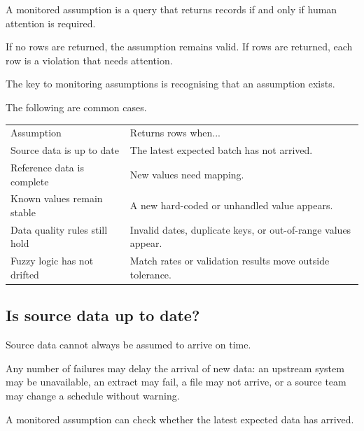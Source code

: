 \documentclass[10pt,openany,10pt]{book}
\newcounter{none}
\let\podeToprule\toprule
\let\podeMidrule\midrule
\let\podeBottomrule\bottomrule
\renewcommand{\toprule}{\arrayrulecolor{pbiGrid}\podeToprule}
\renewcommand{\midrule}{\arrayrulecolor{pbiGrid}\podeMidrule}
\renewcommand{\bottomrule}{\arrayrulecolor{pbiGrid}\podeBottomrule}
\begin{document}
A monitored assumption is a query that returns records if and only if
human attention is required.

If no rows are returned, the assumption remains valid. If rows are
returned, each row is a violation that needs attention.

The key to monitoring assumptions is recognising that an assumption
exists.

The following are common cases.

{\def\LTcaptype{none} %
\begin{longtable}[]{@{}
  >{\raggedright\arraybackslash}p{}
  >{\raggedright\arraybackslash}p{}@{}}
\toprule\noalign{}
\begin{minipage}[b]{\linewidth}\raggedright
Assumption
\end{minipage} & \begin{minipage}[b]{\linewidth}\raggedright
Returns rows when...
\end{minipage} \\
\midrule\noalign{}
\endhead
\bottomrule\noalign{}
\endlastfoot
Source data is up to date & The latest expected batch has not
arrived. \\
Reference data is complete & New values need mapping. \\
Known values remain stable & A new hard-coded or unhandled value
appears. \\
Data quality rules still hold & Invalid dates, duplicate keys, or
out-of-range values appear. \\
Fuzzy logic has not drifted & Match rates or validation results move
outside tolerance. \\
\end{longtable}
}

\subsection{Is source data up to date?}\label{is-source-data-up-to-date}

Source data cannot always be assumed to arrive on time.

Any number of failures may delay the arrival of new data: an upstream
system may be unavailable, an extract may fail, a file may not arrive,
or a source team may change a schedule without warning.

A monitored assumption can check whether the latest expected data has
arrived.
\end{document}
